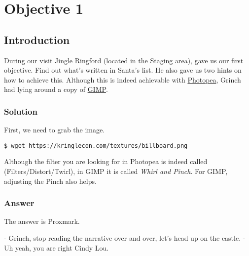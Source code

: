 \chapter{Objective 1}

\section{Introduction}

During our visit {\color{codegreen}Jingle Ringford} (located in the Staging area),
gave us our first objective. Find out what's written in Santa's list. He also gave us two hints on how to achieve this.
Although this is indeed achievable with \href{https://www.photopea.com}{Photopea}, Grinch had lying around a copy of
\href{https://www.gimp.org}{GIMP}.

\subsection{Solution}
First, we need to grab the image.
\begin{verbatim}
$ wget https://kringlecon.com/textures/billboard.png
\end{verbatim}

Although the filter you are looking for in Photopea is indeed called (Filters/Distort/Twirl), in GIMP it is called
\textit{Whirl and Pinch}. For GIMP, adjusting the Pinch also helps.

\subsection{Answer}
The answer is Proxmark.

- Grinch, stop reading the narrative over and over, let's head up on the castle.
- Uh yeah, you are right Cindy Lou.
